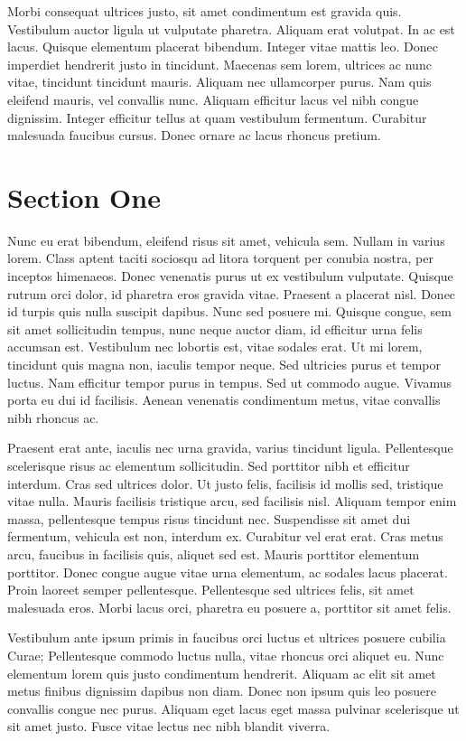 Morbi consequat ultrices justo, sit amet condimentum est gravida
quis. Vestibulum auctor ligula ut vulputate pharetra. Aliquam erat
volutpat. In ac est lacus. Quisque elementum placerat bibendum. Integer
vitae mattis leo. Donec imperdiet hendrerit justo in tincidunt. Maecenas
sem lorem, ultrices ac nunc vitae, tincidunt tincidunt mauris. Aliquam
nec ullamcorper purus. Nam quis eleifend mauris, vel convallis
nunc. Aliquam efficitur lacus vel nibh congue dignissim. Integer
efficitur tellus at quam vestibulum fermentum. Curabitur malesuada
faucibus cursus. Donec ornare ac lacus rhoncus pretium.

\section{Section One}
Nunc eu erat bibendum, eleifend risus sit amet, vehicula sem. Nullam in
varius lorem. Class aptent taciti sociosqu ad litora torquent per
conubia nostra, per inceptos himenaeos. Donec venenatis purus ut ex
vestibulum vulputate. Quisque rutrum orci dolor, id pharetra eros
gravida vitae. Praesent a placerat nisl. Donec id turpis quis nulla
suscipit dapibus. Nunc sed posuere mi. Quisque congue, sem sit amet
sollicitudin tempus, nunc neque auctor diam, id efficitur urna felis
accumsan est. Vestibulum nec lobortis est, vitae sodales erat. Ut mi
lorem, tincidunt quis magna non, iaculis tempor neque. Sed ultricies
purus et tempor luctus. Nam efficitur tempor purus in tempus. Sed ut
commodo augue. Vivamus porta eu dui id facilisis. Aenean venenatis
condimentum metus, vitae convallis nibh rhoncus ac.

Praesent erat ante, iaculis nec urna gravida, varius tincidunt
ligula. Pellentesque scelerisque risus ac elementum sollicitudin. Sed
porttitor nibh et efficitur interdum. Cras sed ultrices dolor. Ut justo
felis, facilisis id mollis sed, tristique vitae nulla. Mauris facilisis
tristique arcu, sed facilisis nisl. Aliquam tempor enim massa,
pellentesque tempus risus tincidunt nec. Suspendisse sit amet dui
fermentum, vehicula est non, interdum ex. Curabitur vel erat erat. Cras
metus arcu, faucibus in facilisis quis, aliquet sed est. Mauris
porttitor elementum porttitor. Donec congue augue vitae urna elementum,
ac sodales lacus placerat. Proin laoreet semper
pellentesque. Pellentesque sed ultrices felis, sit amet malesuada
eros. Morbi lacus orci, pharetra eu posuere a, porttitor sit amet
felis.

Vestibulum ante ipsum primis in faucibus orci luctus et ultrices posuere
cubilia Curae; Pellentesque commodo luctus nulla, vitae rhoncus orci
aliquet eu. Nunc elementum lorem quis justo condimentum
hendrerit. Aliquam ac elit sit amet metus finibus dignissim dapibus non
diam. Donec non ipsum quis leo posuere convallis congue nec
purus. Aliquam eget lacus eget massa pulvinar scelerisque ut sit amet
justo. Fusce vitae lectus nec nibh blandit viverra.

